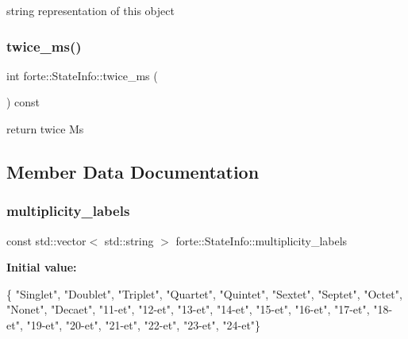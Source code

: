string representation of this object 

\mbox{\label{classforte_1_1_state_info_aecba70ee7401a519978f6960637175e8}} 
\subsubsection{\texorpdfstring{twice\+\_\+ms()}{twice\_ms()}}
{\footnotesize\ttfamily int forte\+::\+State\+Info\+::twice\+\_\+ms (\begin{DoxyParamCaption}{ }\end{DoxyParamCaption}) const}



return twice Ms 



\subsection{Member Data Documentation}
\mbox{\label{classforte_1_1_state_info_a435a4361da5759caff8c08fe80a89e54}} 
\subsubsection{\texorpdfstring{multiplicity\+\_\+labels}{multiplicity\_labels}}
{\footnotesize\ttfamily const std\+::vector$<$ std\+::string $>$ forte\+::\+State\+Info\+::multiplicity\+\_\+labels\hspace{0.3cm}{\ttfamily [static]}}

{\bfseries Initial value\+:}
\begin{DoxyCode}
\{
    \textcolor{stringliteral}{"Singlet"}, \textcolor{stringliteral}{"Doublet"}, \textcolor{stringliteral}{"Triplet"}, \textcolor{stringliteral}{"Quartet"}, \textcolor{stringliteral}{"Quintet"}, \textcolor{stringliteral}{"Sextet"}, \textcolor{stringliteral}{"Septet"}, \textcolor{stringliteral}{"Octet"},
    \textcolor{stringliteral}{"Nonet"},   \textcolor{stringliteral}{"Decaet"},  \textcolor{stringliteral}{"11-et"},   \textcolor{stringliteral}{"12-et"},   \textcolor{stringliteral}{"13-et"},   \textcolor{stringliteral}{"14-et"},  \textcolor{stringliteral}{"15-et"},  \textcolor{stringliteral}{"16-et"},
    \textcolor{stringliteral}{"17-et"},   \textcolor{stringliteral}{"18-et"},   \textcolor{stringliteral}{"19-et"},   \textcolor{stringliteral}{"20-et"},   \textcolor{stringliteral}{"21-et"},   \textcolor{stringliteral}{"22-et"},  \textcolor{stringliteral}{"23-et"},  \textcolor{stringliteral}{"24-et"}\}
\end{DoxyCode}


